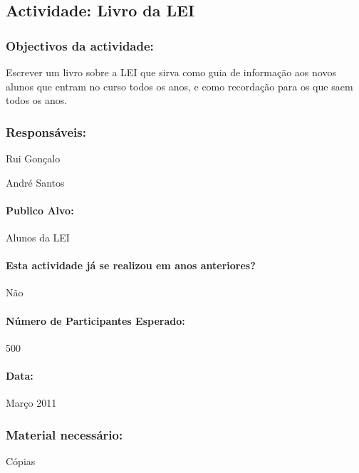 \subsection{Actividade: Livro da LEI} %

\subsubsection*{Objectivos da actividade:}
Escrever um livro sobre a LEI que sirva como guia de informação aos novos alunos que entram no curso todos os anos, e como recordação para os que saem todos os anos.

\subsubsection*{Responsáveis:}
\begin{itemizedash}
	\item{Rui Gonçalo}
	\item{André Santos}
\end{itemizedash}

\paragraph{Publico Alvo: }
Alunos da LEI
\paragraph{Esta actividade já se realizou em anos anteriores?}
Não

\paragraph{Número de Participantes Esperado:}
500

\paragraph{Data:} Março 2011

\subsubsection*{Material necessário:}
\begin{itemizedash}
	\item{Cópias}
\end{itemizedash}

